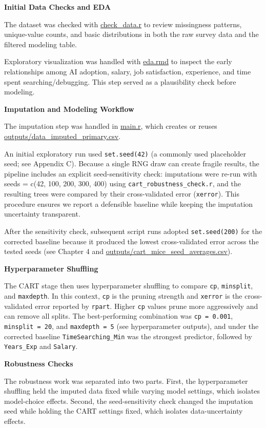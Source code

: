 \documentclass[
]{article}
\begin{document}
\textbf{Initial Data Checks and EDA}

The dataset was checked with \url{check_data.r} to review missingness
patterns, unique-value counts, and basic distributions in both the raw
survey data and the filtered modeling table.

Exploratory visualization was handled with \url{eda.rmd} to inspect the
early relationships among AI adoption, salary, job satisfaction,
experience, and time spent searching/debugging. This step served as a
plausibility check before modeling.

\textbf{Imputation and Modeling Workflow}

The imputation step was handled in \url{main.r}, which creates or reuses
\url{outputs/data_imputed_primary.csv}.

An initial exploratory run used \texttt{set.seed(42)} (a commonly used
placeholder seed; see Appendix C). Because a single RNG draw can create
fragile results, the pipeline includes an explicit seed-sensitivity
check: imputations were re-run with seeds = c(42, 100, 200, 300, 400)
using \texttt{cart\_robustness\_check.r}, and the resulting trees were
compared by their cross-validated error (\texttt{xerror}). This
procedure ensures we report a defensible baseline while keeping the
imputation uncertainty transparent.

After the sensitivity check, subsequent script runs adopted
\texttt{set.seed(200)} for the corrected baseline because it produced
the lowest cross-validated error across the tested seeds (see Chapter 4
and \url{outputs/cart_mice_seed_averages.csv}).

\textbf{Hyperparameter Shuffling}

The CART stage then uses hyperparameter shuffling to compare
\texttt{cp}, \texttt{minsplit}, and \texttt{maxdepth}. In this context,
\texttt{cp} is the pruning strength and \texttt{xerror} is the
cross-validated error reported by \texttt{rpart}. Higher \texttt{cp}
values prune more aggressively and can remove all splits. The
best-performing combination was \texttt{cp\ =\ 0.001},
\texttt{minsplit\ =\ 20}, and \texttt{maxdepth\ =\ 5} (see
hyperparameter outputs), and under the corrected baseline
\texttt{TimeSearching\_Min} was the strongest predictor, followed by
\texttt{Years\_Exp} and \texttt{Salary}.

\textbf{Robustness Checks}

The robustness work was separated into two parts. First, the
hyperparameter shuffling held the imputed data fixed while varying model
settings, which isolates model-choice effects. Second, the
seed-sensitivity check changed the imputation seed while holding the
CART settings fixed, which isolates data-uncertainty effects.
\end{document}
